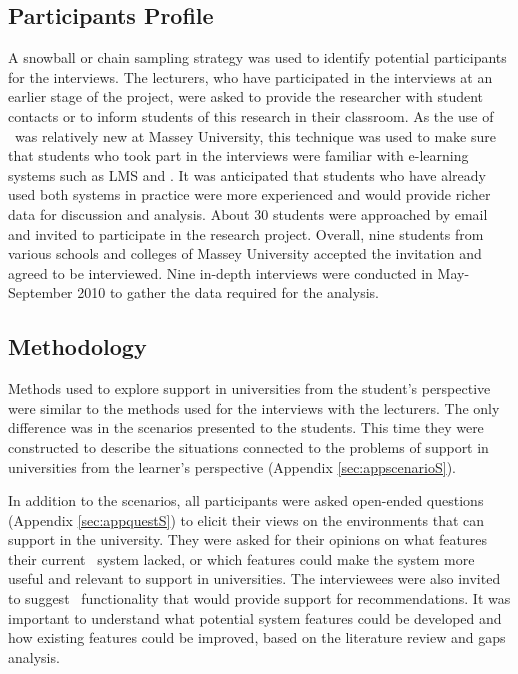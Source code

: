 \subsection{Participants Profile}

A snowball or chain sampling strategy \citep{Mack2005, Marshall2010} was used to
identify potential participants for the interviews. The lecturers, who have
participated in the interviews at an earlier stage of the project, were asked to
provide the researcher with student contacts or to inform students of this
research in their classroom. As the use of \ep~was relatively new at Massey
University, this technique was used to make sure that students who took part in
the interviews were familiar with e-learning systems such as LMS and \ep. It was
anticipated that students who have already used both systems in practice were
more experienced and would provide richer data for discussion and analysis.
About 30 students were approached by email and invited to participate in the
research project. Overall, nine students from various schools and colleges of
Massey University accepted the invitation and agreed to be interviewed. Nine
in-depth interviews were conducted in May-September 2010 to gather the data
required for the analysis. 

\subsection{Methodology}

Methods used to explore \LLLs support in universities from the student's
perspective were similar to the methods used for the interviews with the
lecturers. The only difference was in the scenarios presented to the students.
This time they were constructed to describe the situations connected to the
problems of \LLLs support in universities from the learner's perspective
(Appendix \ref{sec:appscenarioS}).

In addition to the scenarios, all participants were asked open-ended questions
(Appendix \ref{sec:appquestS}) to elicit their views on the environments that
can support \LLLs in the university. They were asked for their opinions on what
features their current \ep~system lacked, or which features could make the
system more useful and relevant to \LLLs support in universities. The
interviewees were also invited to suggest \ep~functionality that would provide
support for \LLLs recommendations. It was important to understand what potential
system features could be developed and how existing features could be improved,
based on the literature review and gaps analysis.

